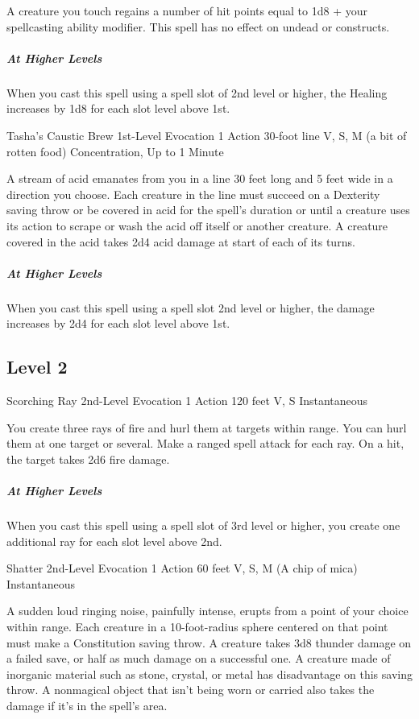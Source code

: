{A creature you touch regains a number of hit points equal to 1d8 + your spellcasting ability modifier. This spell has no effect on undead or constructs.

\subparagraph*{At Higher Levels} When you cast this spell using a spell slot of 2nd level or higher, the Healing increases by 1d8 for each slot level above 1st.

\DndSpellHeader
  {Tasha's Caustic Brew}
  {1st-Level Evocation}
  {1 Action}
  {30-foot line}
  {V, S, M (a bit of rotten food)}
  {Concentration, Up to 1 Minute}
  
A stream of acid emanates from you in a line 30 feet long and 5 feet wide in a direction you choose. Each creature in the line must succeed on a Dexterity saving throw or be covered in acid for the spell’s duration or until a creature uses its action to scrape or wash the acid off itself or another creature. A creature covered in the acid takes 2d4 acid damage at start of each of its turns.

\subparagraph*{At Higher Levels} When you cast this spell using a spell slot 2nd level or higher, the damage increases by 2d4 for each slot level above 1st.

\subsection*{Level 2}

\DndSpellHeader
  {Scorching Ray}
  {2nd-Level Evocation}
  {1 Action}
  {120 feet}
  {V, S}
  {Instantaneous}
  
You create three rays of fire and hurl them at targets within range. You can hurl them at one target or several. Make a ranged spell attack for each ray. On a hit, the target takes 2d6 fire damage.

\subparagraph*{At Higher Levels} When you cast this spell using a spell slot of 3rd level or higher, you create one additional ray for each slot level above 2nd.

\DndSpellHeader
  {Shatter}
  {2nd-Level Evocation}
  {1 Action}
  {60 feet}
  {V, S, M (A chip of mica)}
  {Instantaneous}
  
A sudden loud ringing noise, painfully intense, erupts from a point of your choice within range. Each creature in a 10-foot-radius sphere centered on that point must make a Constitution saving throw. A creature takes 3d8 thunder damage on a failed save, or half as much damage on a successful one. A creature made of inorganic material such as stone, crystal, or metal has disadvantage on this saving throw. A nonmagical object that isn’t being worn or carried also takes the damage if it’s in the spell’s area.

}
